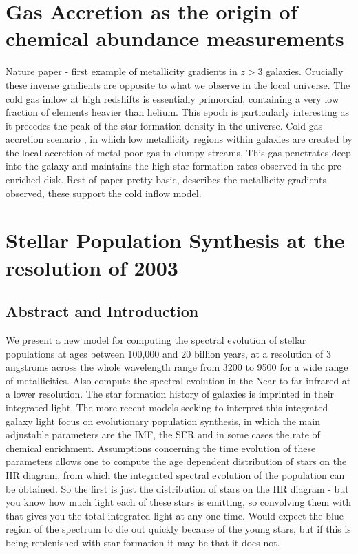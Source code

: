 \documentclass{literature}
\begin{document}
\section{Gas Accretion as the origin of chemical abundance measurements}\label{sec:Cresci_2010}
Nature paper - first example of metallicity gradients in $z > 3$ galaxies. Crucially these inverse gradients are opposite to what we observe in the local universe. The cold gas inflow at high redshifts is essentially primordial, containing a very low fraction of elements heavier than helium. This epoch is particularly interesting as it precedes the peak of the star formation density in the universe. Cold gas accretion scenario \citep{Keres2005}, in which low metallicity regions within galaxies are created by the local accretion of metal-poor gas in clumpy streams. This gas penetrates deep into the galaxy and maintains the high star formation rates observed in the pre-enriched disk. Rest of paper pretty basic, describes the metallicity gradients observed, these support the cold inflow model.  


\section{Stellar Population Synthesis at the resolution of 2003}\label{sec:BC03}
\subsection{Abstract and Introduction} 
We present a new model for computing the spectral evolution of stellar populations at ages between 100,000 and 20 billion years, at a resolution of 3 angstroms across the whole wavelength range from 3200 to 9500 for a wide range of metallicities. Also compute the spectral evolution in the Near to far infrared at a lower resolution. The star formation history of galaxies is imprinted in their integrated light. The more recent models seeking to interpret this integrated galaxy light focus on evolutionary population synthesis, in which the main adjustable parameters are the IMF, the SFR and in some cases the rate of chemical enrichment. Assumptions concerning the time evolution of these parameters allows one to compute the age dependent distribution of stars on the HR diagram, from which the integrated spectral evolution of the population can be obtained. So the first is just the distribution of stars on the HR diagram - but you know how much light each of these stars is emitting, so convolving them with that gives you the total integrated light at any one time. Would expect the blue region of the spectrum to die out quickly because of the young stars, but if this is being replenished with star formation it may be that it does not. \\
\end{document}
